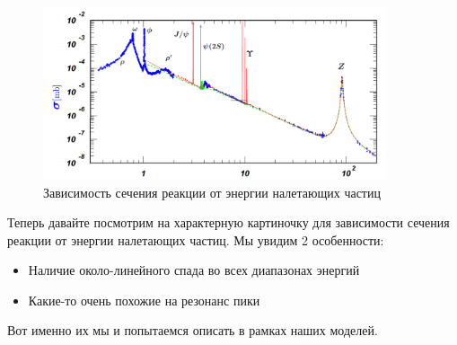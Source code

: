 \documentclass[12pt]{article}
\begin{document}
\begin{figure}[h]
    \centering
    \includegraphics[width=0.9\textwidth,height=\textheight,keepaspectratio]{Seminar_10/pics/pic_02_barn.PNG}
    \caption{Зависимость сечения реакции от энергии налетающих частиц}
    \label{fig:sem_10_barn}
\end{figure}

Теперь давайте посмотрим на характерную картиночку для зависимости сечения реакции от энергии налетающих частиц. Мы увидим 2 особенности:
\begin{itemize}
    \item Наличие около-линейного спада во всех диапазонах энергий
    \item Какие-то очень похожие на резонанс пики
\end{itemize}
Вот именно их мы и попытаемся описать в рамках наших моделей.
\end{document}
